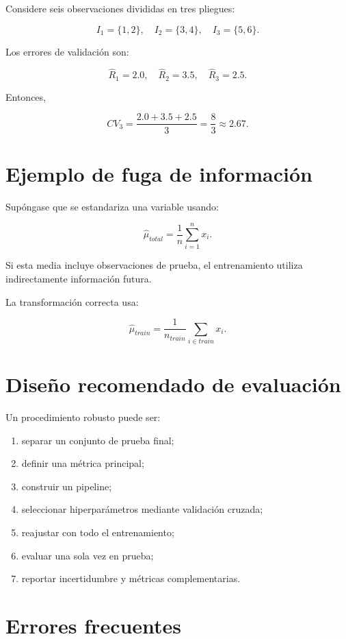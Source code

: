 \documentclass[
  spanish,
  11pt,
  letterpaper,
  DIV=11,
  numbers=noendperiod]{scrreprt}
\providecommand{\tightlist}{%
  \setlength{\itemsep}{0pt}\setlength{\parskip}{0pt}}
\theoremstyle{definition}
\theoremstyle{plain}
\theoremstyle{definition}
\theoremstyle{remark}
\begin{document}
Considere seis observaciones divididas en tres pliegues:

\[
I_1=\{1,2\},
\quad
I_2=\{3,4\},
\quad
I_3=\{5,6\}.
\]

Los errores de validación son:

\[
\widehat{R}_1=2.0,
\quad
\widehat{R}_2=3.5,
\quad
\widehat{R}_3=2.5.
\]

Entonces,

\[
CV_3
=
\frac{2.0+3.5+2.5}{3}
=
\frac{8}{3}
\approx
2.67.
\]

\section{Ejemplo de fuga de
información}\label{ejemplo-de-fuga-de-informaciuxf3n}

Supóngase que se estandariza una variable usando:

\[
\widehat{\mu}_{total}
=
\frac{1}{n}
\sum_{i=1}^{n}x_i.
\]

Si esta media incluye observaciones de prueba, el entrenamiento utiliza
indirectamente información futura.

La transformación correcta usa:

\[
\widehat{\mu}_{train}
=
\frac{1}{n_{train}}
\sum_{i\in train}x_i.
\]

\section{Diseño recomendado de
evaluación}\label{diseuxf1o-recomendado-de-evaluaciuxf3n}

Un procedimiento robusto puede ser:

\begin{enumerate}
\def\labelenumi{\arabic{enumi}.}
\tightlist
\item
  separar un conjunto de prueba final;
\item
  definir una métrica principal;
\item
  construir un pipeline;
\item
  seleccionar hiperparámetros mediante validación cruzada;
\item
  reajustar con todo el entrenamiento;
\item
  evaluar una sola vez en prueba;
\item
  reportar incertidumbre y métricas complementarias.
\end{enumerate}

\section{Errores frecuentes}\label{errores-frecuentes-6}
\end{document}
